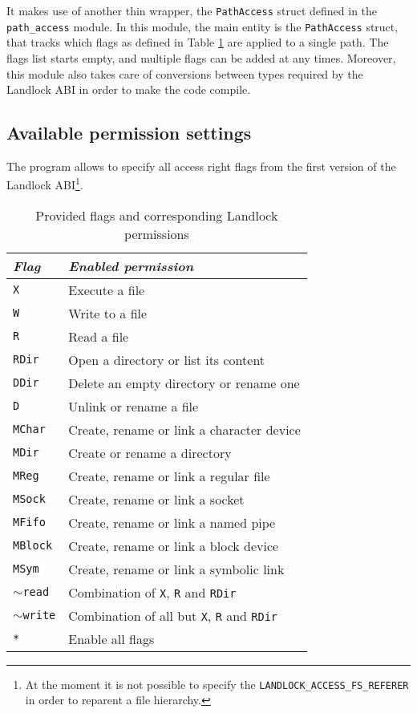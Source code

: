 It makes use of another thin wrapper, the \texttt{PathAccess} struct defined in the \texttt{path\_access} module.
In this module, the main entity is the \texttt{PathAccess} struct, that tracks which flags as defined in Table \ref{table:landlock-flags}
are applied to a single path. The flags list starts empty, and multiple flags can be added at any times.
Moreover, this module also takes care of conversions between types required by the Landlock ABI in order
to make the code compile.

\subsection{Available permission settings}

The program allows to specify all access right flags from the first version of the Landlock
ABI\footnote{At the moment it is not possible to specify the \texttt{LANDLOCK\_ACCESS\_FS\_REFERER} in order to reparent a file hierarchy.}.

\begin{table}
  \centering
  \begin{tabular}{|l|l|}
    \hline
    \textit{Flag} & \textit{Enabled permission} \\ \hline\hline
    \texttt{X} & Execute a file \\ \hline
    \texttt{W} & Write to a file \\ \hline
    \texttt{R} & Read a file \\ \hline
    \texttt{RDir} & Open a directory or list its content \\ \hline
    \texttt{DDir} & Delete an empty directory or rename one \\ \hline
    \texttt{D} & Unlink or rename a file \\ \hline
    \texttt{MChar} & Create, rename or link a character device \\ \hline
    \texttt{MDir} & Create or rename a directory \\ \hline
    \texttt{MReg} & Create, rename or link a regular file \\ \hline
    \texttt{MSock} & Create, rename or link a socket \\ \hline
    \texttt{MFifo} & Create, rename or link a named pipe \\ \hline
    \texttt{MBlock} & Create, rename or link a block device \\ \hline
    \texttt{MSym} & Create, rename or link a symbolic link \\ \hline
    \texttt{$\sim$read} & Combination of \texttt{X}, \texttt{R} and \texttt{RDir} \\ \hline
    \texttt{$\sim$write} & Combination of all but \texttt{X}, \texttt{R} and \texttt{RDir} \\ \hline
    \texttt{*} & Enable all flags \\ \hline
  \end{tabular}
  \caption{Provided flags and corresponding Landlock permissions}
  \label{table:landlock-flags}
\end{table}

